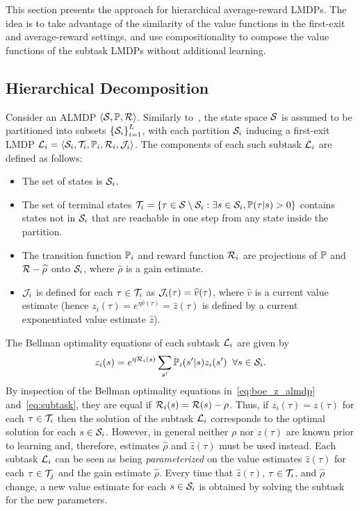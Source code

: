 This section presents the approach for hierarchical average-reward LMDPs. The idea is to take advantage of the similarity of the value functions in the first-exit and average-reward settings, and use compositionality to compose the value functions of the subtask LMDPs without additional learning.

\subsection{Hierarchical Decomposition}
Consider an ALMDP $\langle\mathcal{S},\mathbb{P},\mathcal{R}\rangle$. 
Similarly to~\citet{Infante2022}, the state space $\mathcal{S}$ is assumed to be partitioned into subsets $\left\{\mathcal{S}_i\right\}^L_{i=1}$, with each partition $\mathcal{S}_i$ inducing
a first-exit LMDP $\mathcal{L}_i = \langle\mathcal{S}_i, \mathcal{T}_i, \mathbb{P}_i, \mathcal{R}_i,\mathcal{J}_i\rangle$.
The components of each such subtask $\mathcal{L}_i$ are defined as follows:
\begin{itemize}
  \item The set of states is $\mathcal{S}_i$.
  \item The set of terminal states $\mathcal{T}_i=\{\tau\in\mathcal{S}\setminus\mathcal{S}_i: \exists s\in\mathcal{S}_i, \mathbb{P}(\tau|s)>0\}$ contains states not in $\mathcal{S}_i$ that are reachable in one step from any state inside the partition.
  \item The transition function $\mathbb{P}_i$ and reward function $\mathcal{R}_i$ are projections of $\mathbb{P}$ and $\mathcal{R}-\widehat\rho$ onto $\mathcal{S}_i$, where $\widehat\rho$ is a gain estimate.
  \item $\mathcal{J}_i$ is defined for each $\tau\in\mathcal{T}_i$ as $\mathcal{J}_i(\tau)=\widehat v(\tau)$, where $\widehat v$ is a current value estimate (hence $z_i(\tau)=e^{\eta\widehat v(\tau)} = \widehat z(\tau)$ is defined by a current exponentiated value estimate $\widehat z$).
\end{itemize}
The Bellman optimality equations of each subtask $\mathcal{L}_i$ are given by
\begin{equation}\label{eq:subtask}
  z_i(s) = e^{\eta \mathcal{R}_i(s)} \sum_{s'} \mathbb{P}_i(s'|s) z_i(s') \;\; \forall s\in\mathcal{S}_i.
\end{equation}
By inspection of the Bellman optimality equations in~\eqref{eq:boe_z_almdp} and~\eqref{eq:subtask}, they are equal if $\mathcal{R}_i(s)=\mathcal{R}(s)-\rho$. Thus, if $z_i(\tau)=z(\tau)$ for each $\tau\in\mathcal{T}_i$ then the solution of the subtask $\mathcal{L}_i$ corresponds to the optimal solution for each $s\in\mathcal{S}_i$. However, in general neither $\rho$ nor $z(\tau)$ are known prior to learning and, therefore, estimates $\widehat\rho$ and $\widehat z(\tau)$ must be used instead. Each subtask $\mathcal{L}_i$ can be seen as being {\it parameterized\/} on the value estimates $\widehat z(\tau)$ for each $\tau\in\mathcal{T}_j$ and the gain estimate $\widehat\rho$. Every time that $\widehat z(\tau)$, $\tau\in\mathcal{T}_i$, and $\widehat\rho$ change, a new value estimate for each $s\in\mathcal{S}_i$ is obtained by solving the subtask for the new parameters.

